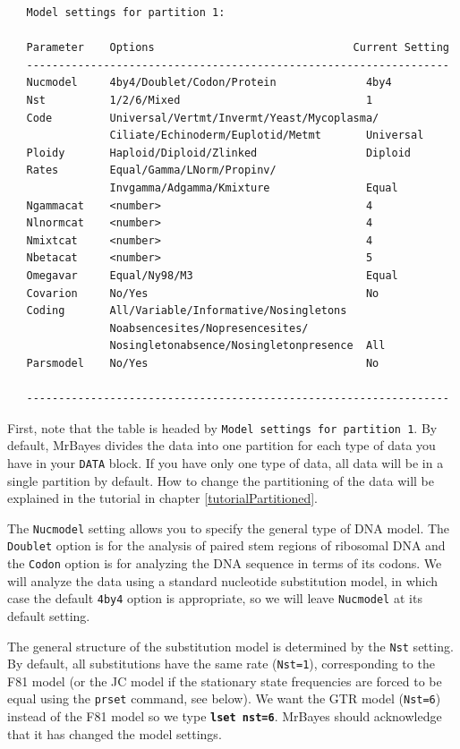 \documentclass[12pt]{book}
\newcommand{\ttt}[1]{\texttt{#1}}
\newcommand{\tb}[1]{\ttt{\textbf{#1}}}
\begin{document}
\begin{singlespacing}
\footnotesize
\begin{verbatim}
   Model settings for partition 1:

   Parameter    Options                               Current Setting
   ------------------------------------------------------------------
   Nucmodel     4by4/Doublet/Codon/Protein              4by4
   Nst          1/2/6/Mixed                             1
   Code         Universal/Vertmt/Invermt/Yeast/Mycoplasma/
                Ciliate/Echinoderm/Euplotid/Metmt       Universal
   Ploidy       Haploid/Diploid/Zlinked                 Diploid
   Rates        Equal/Gamma/LNorm/Propinv/
                Invgamma/Adgamma/Kmixture               Equal
   Ngammacat    <number>                                4
   Nlnormcat    <number>                                4
   Nmixtcat     <number>                                4
   Nbetacat     <number>                                5
   Omegavar     Equal/Ny98/M3                           Equal
   Covarion     No/Yes                                  No
   Coding       All/Variable/Informative/Nosingletons
                Noabsencesites/Nopresencesites/
                Nosingletonabsence/Nosingletonpresence  All
   Parsmodel    No/Yes                                  No

   ------------------------------------------------------------------
\end{verbatim}
\normalsize
\end{singlespacing}

First, note that the table is headed by \ttt{Model settings for partition 1}. By default, MrBayes
divides the data into one partition for each type of data you have in your \ttt{DATA} block. If you
have only one type of data, all data will be in a single partition by default. How to change the
partitioning of the data will be explained in the tutorial in chapter \ref{tutorialPartitioned}.

The \ttt{Nucmodel} setting allows you to specify the general type of DNA model. The \ttt{Doublet}
option is for the analysis of paired stem regions of ribosomal DNA and the \ttt{Codon} option is
for analyzing the DNA sequence in terms of its codons. We will analyze the data using a standard
nucleotide substitution model, in which case the default \ttt{4by4} option is appropriate, so we
will leave \ttt{Nucmodel} at its default setting.

The general structure of the substitution model is determined by the \ttt{Nst} setting. By default,
all substitutions have the same rate (\ttt{Nst=1}), corresponding to the F81 model (or the JC model
if the stationary state frequencies are forced to be equal using the \ttt{prset} command, see
below). We want the GTR model (\ttt{Nst=6}) instead of the F81 model so we type \tb{lset nst=6}.
MrBayes should acknowledge that it has changed the model settings.
\end{document}
